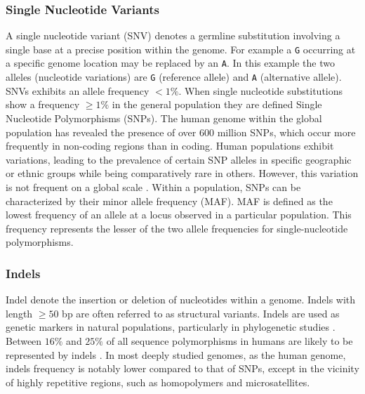 \documentclass[a4paper, titlepage, openright]{book}
\begin{document}
\subsubsection{Single Nucleotide Variants}
A single nucleotide variant (SNV) denotes a germline substitution involving a single base at a precise position within the genome. For example a \texttt{G} occurring at a specific genome location may be replaced by an \texttt{A}. In this example the two alleles (nucleotide variations) are \texttt{G} (reference allele) and \texttt{A} (alternative allele). SNVs exhibits an allele frequency $< 1\%$. When single nucleotide substitutions show a frequency $\geq 1\%$ in the general population they are defined Single Nucleotide Polymorphisms (SNPs). The human genome within the global population has revealed the presence of over 600 million SNPs, which occur more frequently in non-coding regions than in coding. Human populations exhibit variations, leading to the prevalence of certain SNP alleles in specific geographic or ethnic groups while being comparatively rare in others. However, this variation is not frequent on a global scale \citep{bergstrom2020insights}. Within a population, SNPs can be characterized by their minor allele frequency (MAF). MAF is defined as the lowest frequency of an allele at a locus observed in a particular population. This frequency represents the lesser of the two allele frequencies for single-nucleotide polymorphisms.

\subsubsection{Indels}
Indel denote the insertion or deletion of nucleotides within a genome. Indels with length $\geq 50$ bp are often referred to as structural variants. Indels are used as genetic markers in natural populations, particularly in phylogenetic studies \citep{vali2008insertion}. Between $16\%$ and $25\%$ of all sequence polymorphisms in humans are likely to be represented by indels \citep{mills2006initial}. In most deeply studied genomes, as the human genome, indels frequency is notably lower compared to that of SNPs, except in the vicinity of highly repetitive regions, such as homopolymers and microsatellites.

\end{document}
